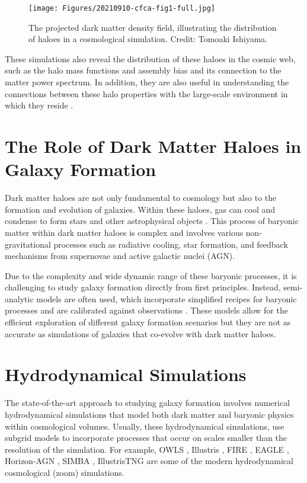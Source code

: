 \begin{figure}
\centering
\texttt{[image: Figures/20210910-cfca-fig1-full.jpg]}
\caption{The projected dark matter density field, illustrating the distribution of haloes in a cosmological simulation. Credit: Tomoaki Ishiyama.}
\label{fig:dm-cosmo-sims-haloes}
\end{figure}

These simulations also reveal the distribution of these haloes in the cosmic web, such as the halo mass functions and assembly bias and its connection to the matter power spectrum. In addition, they are also useful in understanding the connections between these halo properties with the large-scale environment in which they reside \cite[see e.g.][]{2021MNRAS.503.2053R,2022MNRAS.516.5849R}.

\section{The Role of Dark Matter Haloes in Galaxy Formation}

Dark matter haloes are not only fundamental to cosmology but also to the formation and evolution of galaxies. Within these haloes, gas can cool and condense to form stars and other astrophysical objects \citep{1988MNRAS.234..459S,1998MNRAS.295..319M}. This process of baryonic matter within dark matter haloes is complex and involves various non-gravitational processes such as radiative cooling, star formation, and feedback mechanisms from supernovae and active galactic nuclei (AGN).

Due to the complexity and wide dynamic range of these baryonic processes, it is challenging to study galaxy formation directly from first principles. Instead, semi-analytic models are often used, which incorporate simplified recipes for baryonic processes and are calibrated against observations \citep{2015ARA&A..53...51S}. These models allow for the efficient exploration of different galaxy formation scenarios but they are not as accurate as simulations of galaxies that co-evolve with dark matter haloes.

\section{Hydrodynamical Simulations}

The state-of-the-art approach to studying galaxy formation involves numerical hydrodynamical simulations that model both dark matter and baryonic physics within cosmological volumes. Usually, these hydrodynamical simulations, use subgrid models to incorporate processes that occur on scales smaller than the resolution of the simulation. For example, OWLS \citep{2010MNRAS.402.1536S}, Illustris \citep{2014MNRAS.445..175G}, FIRE \citep{2014MNRAS.445..581H}, EAGLE \citep{2015MNRAS.446..521S}, Horizon-AGN \citep[][]{2017MNRAS.467.4739K}, SIMBA \citep[][]{2019MNRAS.486.2827D}, IllustrisTNG \citep{2019ComAC...6....2N} are some of the modern hydrodynamical cosmological (zoom) simulations.

